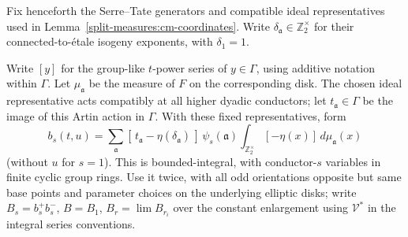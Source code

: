 Fix henceforth the Serre--Tate generators and compatible ideal
representatives used in Lemma~\ref{split-measures:cm-coordinates}.  Write
\(\delta_{\mathfrak a}\in\mathbb Z_2^\times\) for their connected-to-étale
isogeny exponents, with \(\delta_1=1\).

Write \([y]\) for the group-like \(t\)-power series of \(y\in\Gamma\),
using additive notation within \(\Gamma\). Let \(\mu_{\mathfrak a}\) be
the measure of \(F\) on the corresponding disk.  The chosen ideal
representative acts compatibly at all higher dyadic conductors; let
\(t_{\mathfrak a}\in\Gamma\) be the image of this Artin action in
\(\Gamma\).  With these fixed representatives, form
\[
 b_s(t,u)=\sum_{\mathfrak a}
       [\,t_{\mathfrak a}-\eta(\delta_{\mathfrak a})\,]\,\psi_s(\mathfrak a)
                         \int_{\mathbb Z_2^\times}[-\eta(x)]\,d\mu_{\mathfrak a}(x)
\]
(without \(u\) for \(s=1\)). This is bounded-integral, with conductor-\(s\) variables in finite cyclic group rings. Use it twice, with all odd orientations opposite but same base points and parameter choices on the underlying elliptic disks; write \(B_s=b_s^+ b_s^-\), \(B=B_1\), \(B_r=\lim B_{r_i}\) over the constant enlargement using \(\mathcal V^*\) in the integral series conventions.

